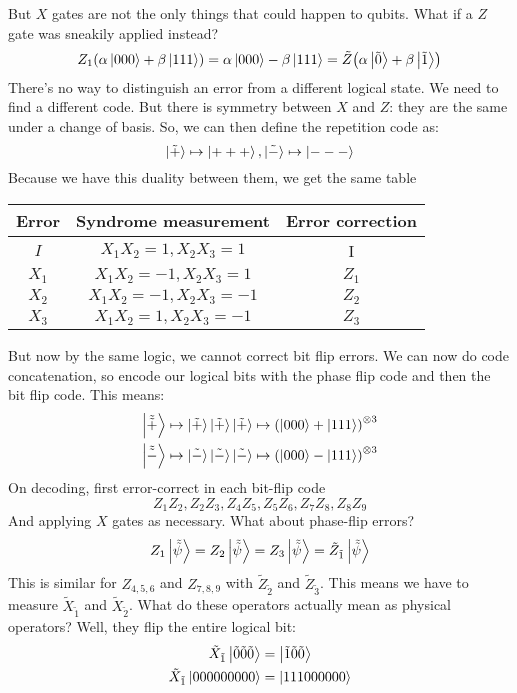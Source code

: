 But $X$ gates are not the only things that could happen to qubits. What if a $Z$ gate was sneakily applied instead?
\[ Z_1 (\alpha \ket{000} + \beta \ket{111}) = \alpha \ket{000} - \beta \ket{111} = \tilde{Z}\qty(\alpha \ket{\tilde{0}} + \beta \ket{\tilde{1}}) \]
There's no way to distinguish an error from a different logical state. We need to find a different code.
But there is symmetry between $X$ and $Z$: they are the same under a change of basis. So, we
can then define the repetition code as:
\[ \ket{\tilde{+}} \mapsto \ket{+++}, \ket{\tilde{-}} \mapsto \ket{---} \]
Because we have this duality between them, we get the same table
\begin{center}
    \begin{tabular}{ | c | c | c | }
        Error & Syndrome measurement & Error correction \\ \hline
        $I$ & $X_1 X_2 = 1, X_2 X_3 = 1$ & I \\ 
        $X_1$ & $X_1 X_2 = -1, X_2 X_3 = 1$ & $Z_1$ \\
        $X_2$ & $X_1 X_2 = -1, X_2 X_3 = -1$ & $Z_2$ \\
        $X_3$ & $X_1 X_2 = 1, X_2 X_3 = -1$ & $Z_3$ \\
\end{tabular}
\end{center}
But now by the same logic, we cannot correct bit flip errors.
We can now do code concatenation, so encode our logical bits with the phase flip code
and then the bit flip code. This means:
\begin{align*}
    \ket{\tilde{\tilde{+}}} &\mapsto \ket{\tilde{+}} \ket{\tilde{+}} \ket{\tilde{+}} \mapsto \qty(\ket{000} + \ket{111})^{\otimes 3} \\
    \ket{\tilde{\tilde{-}}} &\mapsto \ket{\tilde{-}} \ket{\tilde{-}} \ket{\tilde{-}} \mapsto \qty(\ket{000} - \ket{111})^{\otimes 3}
\end{align*}
On decoding, first error-correct in each bit-flip code
\[ Z_1 Z_2, Z_2 Z_3, Z_4 Z_5, Z_5 Z_6, Z_7 Z_8, Z_8 Z_9 \]
And applying $X$ gates as necessary. What about phase-flip errors?
\[ Z_1 \ket{\tilde{\tilde{\psi}}} = Z_2 \ket{\tilde{\tilde{\psi}}} = Z_3 \ket{\tilde{\tilde{\psi}}} = \tilde{Z}_{\tilde{1}} \ket{\tilde{\tilde{\psi}}} \]
This is similar for $Z_{4,5,6}$ and $Z_{7,8,9}$ with $\tilde{Z}_{\tilde{2}}$ and $\tilde{Z}_{\tilde{3}}$.
This means we have to measure $\tilde{X}_{\tilde{1}}$ and $\tilde{X}_{\tilde{2}}$. What do these operators actually mean as physical operators? Well, they flip the entire logical bit:
\begin{align*}
    \tilde{X}_{\tilde{1}} \ket{\tilde{0} \tilde{0} \tilde{0}} &= \ket{\tilde{1} \tilde{0} \tilde{0}} \\
    \tilde{X}_{\tilde{1}} \ket{000000000} &= \ket{111000000}
\end{align*}
